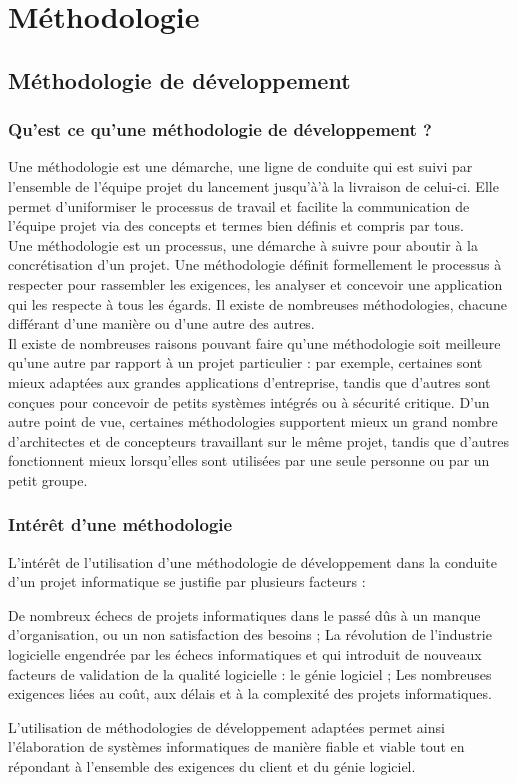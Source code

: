 \chapter{Méthodologie}
\minitoc
\clearpage
\section{Méthodologie de développement}
\subsection{Qu'est ce qu'une méthodologie de développement ?}
Une méthodologie est une démarche, une ligne de conduite qui est suivi par l’ensemble de l’équipe projet du lancement jusqu'à’à la livraison de celui-ci. Elle permet d’uniformiser le processus de travail et facilite la communication de l’équipe projet via des concepts et termes bien définis et compris par tous.\\
Une méthodologie est un processus, une démarche à suivre pour aboutir à la concrétisation d'un projet. Une méthodologie définit formellement le processus à respecter pour rassembler les exigences, les analyser et concevoir une application qui les respecte à tous les égards. Il existe de nombreuses méthodologies, chacune différant d'une manière ou d'une autre des autres. \\
Il existe de nombreuses raisons pouvant faire qu'une méthodologie soit meilleure qu'une autre par rapport à un projet particulier : par exemple, certaines sont mieux adaptées aux grandes applications d'entreprise, tandis que d'autres sont conçues pour concevoir de petits systèmes intégrés ou à sécurité critique. D'un autre point de vue, certaines méthodologies supportent mieux un grand nombre d'architectes et de concepteurs travaillant sur le même projet, tandis que d'autres fonctionnent mieux lorsqu'elles sont utilisées par une seule personne ou par un petit groupe.
\subsection{Intérêt d'une méthodologie}   
L'intérêt de l'utilisation d'une méthodologie de développement dans la conduite d'un projet informatique se justifie par plusieurs facteurs :
\begin{itemize}
	\itemtirait De nombreux échecs de projets informatiques dans le passé dûs à un manque d'organisation, ou un non satisfaction des besoins ;
	\itemtirait La révolution de l'industrie logicielle engendrée par les échecs informatiques et qui
	introduit de nouveaux facteurs de validation de la qualité logicielle : le génie logiciel ;
	\itemtirait Les nombreuses exigences liées au coût, aux délais et à la complexité des projets informatiques.
\end{itemize}
L'utilisation de méthodologies de développement adaptées permet ainsi l'élaboration de systèmes informatiques de manière fiable et viable tout en répondant à l'ensemble des exigences du client et du génie logiciel.                          
